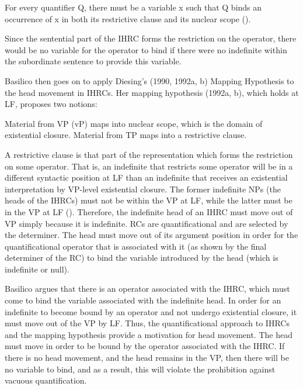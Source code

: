 \documentclass[output=paper]{LSP/langsci}
\begin{document}
\ea For every quantifier Q, there must be a variable x such that Q binds an occurrence of x in both its restrictive clause and its nuclear scope (\citealt{Kratzer1989}). \label{boyle44} 
\z

Since the sentential part of the IHRC forms the restriction on the operator, there would be no variable for the operator to bind if there were no indefinite within the subordinate sentence to provide this variable.

Basilico then goes on to apply Diesing's (1990, 1992a, b) Mapping Hypothesis to the head movement in IHRCs. Her mapping hypothesis (1992a, b), which holds at LF, proposes two notions:

\ea \label{boyle45}
\begin{xlist}
\ex Material from VP (vP) maps into nuclear scope, which is the domain of existential closure.
\ex Material from TP maps into a restrictive clause.
\end{xlist}
\z
 
A restrictive clause is that part of the representation which forms the restriction on some operator. That is, an indefinite that restricts some operator will be in a different syntactic position at LF than an indefinite that receives an existential interpretation by VP-level existential closure. The former indefinite NPs (the heads of the IHRCs) must not be within the VP at LF, while the latter must be in the VP at LF (\citealt{Basilico1996}). Therefore, the indefinite head of an IHRC must move out of VP simply because it is indefinite. RCs are quantificational and are selected by the determiner. The head must move out of its argument position in order for the quantificational operator that is associated with it (as shown by the final determiner of the RC) to bind the variable introduced by the head (which is indefinite or null).   
	
Basilico argues that there is an operator associated with the IHRC, which must come to bind the variable associated with the indefinite head. In order for an indefinite to become bound by an operator and not undergo existential closure, it must move out of the VP by LF. Thus, the quantificational approach to IHRCs and the mapping hypothesis provide a motivation for head movement. The head must move in order to be bound by the operator associated with the IHRC. If there is no head movement, and the head remains in the VP, then there will be no variable to bind, and as a result, this will violate the prohibition against vacuous quantification.  
	
\end{document}
